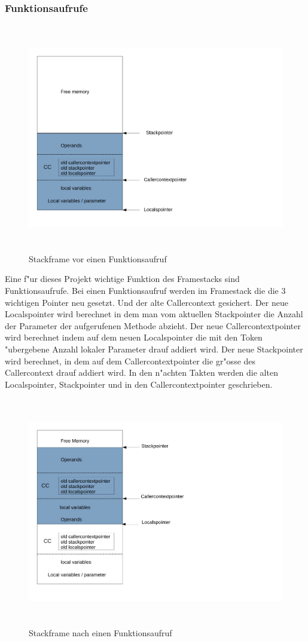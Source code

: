 \subsubsection{Funktionsaufrufe}
\begin{figure}
	\centering
	\includegraphics[height = 10cm]{PS_RS_graphics/Stackframe before Invoke.pdf}
	\caption{Stackframe vor einen Funktionsaufruf}
\end{figure}
Eine f"ur dieses Projekt wichtige Funktion des Framestacks sind Funktionsaufrufe. Bei einen Funktionsaufruf werden im Framestack die die 3 wichtigen Pointer neu gesetzt. Und der alte Callercontext gesichert. Der neue Localspointer wird berechnet in dem man vom aktuellen Stackpointer die Anzahl der Parameter der aufgerufenen Methode abzieht. Der neue Callercontextpointer wird berechnet indem auf dem neuen Localspointer die mit den Token "ubergebene Anzahl lokaler Parameter drauf addiert wird. Der neue Stackpointer wird berechnet, in dem auf dem Callercontextpointer die gr"o{ss}e des Callercontext drauf addiert wird. 
In den n"achten Takten werden die alten Localspointer, Stackpointer und in den Callercontextpointer geschrieben. 
\begin{figure}
	\centering
	\includegraphics[height = 10cm]{PS_RS_graphics/Stackframe after Invoke.pdf}
	\caption{Stackframe nach einen Funktionsaufruf}
\end{figure}


